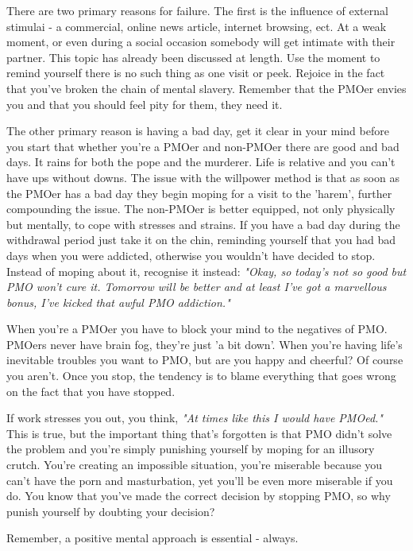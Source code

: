 \documentclass[easypeasy.tex]{subfiles}
\begin{document}
There are two primary reasons for failure. The first is the influence of external stimulai - a commercial, online news article, internet browsing, ect. At a weak moment, or even during a social occasion somebody will get intimate with their partner. This topic has already been discussed at length. Use the moment to remind yourself there is no such thing as one visit or peek. Rejoice in the fact that you've broken the chain of mental slavery. Remember that the PMOer envies you and that you should feel pity for them, they need it.

The other primary reason is having a bad day, get it clear in your mind before you start that whether you're a PMOer and non-PMOer there are good and bad days. It rains for both the pope and the murderer. Life is relative and you can't have ups without downs. The issue with the willpower method is that as soon as the PMOer has a bad day they begin moping for a visit to the 'harem', further compounding the issue. The non-PMOer is better equipped, not only physically but mentally, to cope with stresses and strains. If you have a bad day during the withdrawal period just take it on the chin, reminding yourself that you had bad days when you were addicted, otherwise you wouldn't have decided to stop. Instead of moping about it, recognise it instead: \textit{"Okay, so today's not so good but PMO won't cure it. Tomorrow will be better and at least I've got a marvellous bonus, I've kicked that awful PMO addiction."}

When you're a PMOer you have to block your mind to the negatives of PMO. PMOers never have brain fog, they're just 'a bit down'. When you're having life's inevitable troubles you want to PMO, but are you happy and cheerful? Of course you aren't. Once you stop, the tendency is to blame everything that goes wrong on the fact that you have stopped.

If work stresses you out, you think, \textit{"At times like this I would have PMOed."} This is true, but the important thing that's forgotten is that PMO didn't solve the problem and you're simply punishing yourself by moping for an illusory crutch. You're creating an impossible situation, you're miserable because you can't have the porn and masturbation, yet you'll be even more miserable if you do. You know that you've made the correct decision by stopping PMO, so why punish yourself by doubting your decision?

{\Large Remember, a positive mental approach is essential - always.}
\end{document}
